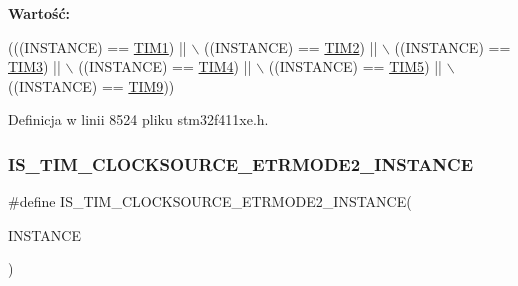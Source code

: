 {\bfseries Wartość\+:}
\begin{DoxyCode}
(((INSTANCE) == \hyperlink{group___peripheral__declaration_ga2e87451fea8dc9380056d3cfc5ed81fb}{TIM1}) || \(\backslash\)
                                                        ((INSTANCE) == \hyperlink{group___peripheral__declaration_ga3cfac9f2e43673f790f8668d48b4b92b}{TIM2}) || \(\backslash\)
                                                        ((INSTANCE) == \hyperlink{group___peripheral__declaration_ga61ee4c391385607d7af432b63905fcc9}{TIM3}) || \(\backslash\)
                                                        ((INSTANCE) == \hyperlink{group___peripheral__declaration_ga91a09bad8bdc7a1cb3d85cf49c94c8ec}{TIM4}) || \(\backslash\)
                                                        ((INSTANCE) == \hyperlink{group___peripheral__declaration_ga5125ff6a23a2ed66e2e19bd196128c14}{TIM5}) || \(\backslash\)
                                                        ((INSTANCE) == \hyperlink{group___peripheral__declaration_gaf52b4b4c36110a0addfa98059f54a50e}{TIM9}))
\end{DoxyCode}


Definicja w linii 8524 pliku stm32f411xe.\+h.

\mbox{\label{group___exported__macros_ga7beb8f84094e6a1567d10177cc4fdae9}} 
\subsubsection{\texorpdfstring{I\+S\+\_\+\+T\+I\+M\+\_\+\+C\+L\+O\+C\+K\+S\+O\+U\+R\+C\+E\+\_\+\+E\+T\+R\+M\+O\+D\+E2\+\_\+\+I\+N\+S\+T\+A\+N\+CE}{IS\_TIM\_CLOCKSOURCE\_ETRMODE2\_INSTANCE}}
{\footnotesize\ttfamily \#define I\+S\+\_\+\+T\+I\+M\+\_\+\+C\+L\+O\+C\+K\+S\+O\+U\+R\+C\+E\+\_\+\+E\+T\+R\+M\+O\+D\+E2\+\_\+\+I\+N\+S\+T\+A\+N\+CE(\begin{DoxyParamCaption}\item[{}]{I\+N\+S\+T\+A\+N\+CE }\end{DoxyParamCaption})}

